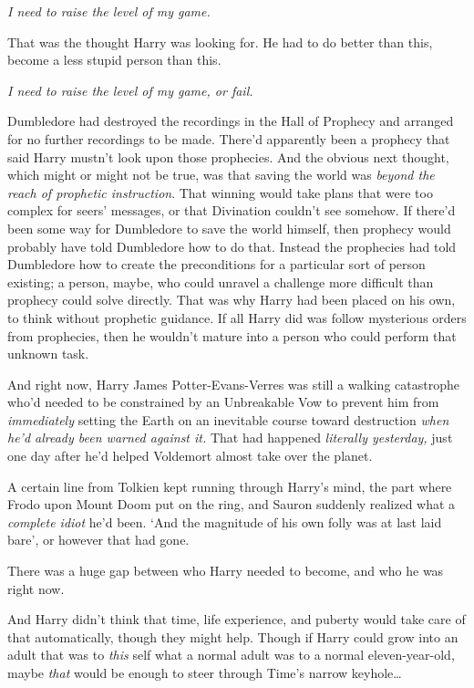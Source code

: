 \emph{I need to raise the level of my game.}

That was the thought Harry was looking for. He had to do better than this, become a less stupid person than this.

\emph{I need to raise the level of my game, or fail.}

Dumbledore had destroyed the recordings in the Hall of Prophecy and arranged for no further recordings to be made. There’d apparently been a prophecy that said Harry mustn’t look upon those prophecies. And the obvious next thought, which might or might not be true, was that saving the world was \emph{beyond the reach of prophetic instruction}. That winning would take plans that were too complex for seers’ messages, or that Divination couldn’t see somehow. If there’d been some way for Dumbledore to save the world himself, then prophecy would probably have told Dumbledore how to do that. Instead the prophecies had told Dumbledore how to create the preconditions for a particular sort of person existing; a person, maybe, who could unravel a challenge more difficult than prophecy could solve directly. That was why Harry had been placed on his own, to think without prophetic guidance. If all Harry did was follow mysterious orders from prophecies, then he wouldn’t mature into a person who could perform that unknown task.

And right now, Harry James Potter-Evans-Verres was still a walking catastrophe who’d needed to be constrained by an Unbreakable Vow to prevent him from \emph{immediately} setting the Earth on an inevitable course toward destruction \emph{when he’d already been warned against it.} That had happened \emph{literally yesterday,} just one day after he’d helped Voldemort almost take over the planet.

A certain line from Tolkien kept running through Harry’s mind, the part where Frodo upon Mount Doom put on the ring, and Sauron suddenly realized what a \emph{complete idiot} he’d been. ‘And the magnitude of his own folly was at last laid bare’, or however that had gone.

There was a huge gap between who Harry needed to become, and who he was right now.

And Harry didn’t think that time, life experience, and puberty would take care of that automatically, though they might help. Though if Harry could grow into an adult that was to \emph{this} self what a normal adult was to a normal eleven-year-old, maybe \emph{that} would be enough to steer through Time’s narrow keyhole…


